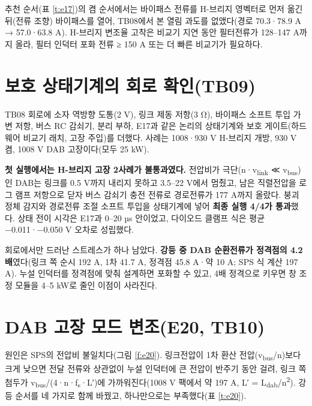 추천 순서(표 \ref{t:e17})의 켬 순서에서는 바이패스 전류를 H-브리지 영벡터로 먼저 옮긴 뒤(전류 조향) 바이패스를 열어, TB08에서 본 열림 과도를 없앴다(경로 70.3·78.9 A → 57.0·63.8 A). H-브리지 변조율 고착은 비교기 지연 동안 필터전류가 128–147 A까지 올라, 필터 인덕터 포화 전류 ≥ 150 A 또는 더 빠른 비교기가 필요하다.

\section{보호 상태기계의 회로 확인(TB09)}

TB08 회로에 소자 역방향 도통(2 V), 링크 제동 저항(3 Ω), 바이패스 소프트 투입 가변 저항, 버스 RC 감쇠기, 분리 부하, E17과 같은 논리의 상태기계와 보호 게이트(하드웨어 비교기 래치, 고장 주입)를 더했다. 사례는 1008·930 V H-브리지 개방, 930 V 켬, 1008 V DAB 고장이다(모두 25 kW).

\textbf{첫 실행에서는 H-브리지 고장 2사례가 불통과였다.} 전압비가 극단(n·v\textsubscript{link} ≪ v\textsubscript{bus})인 DAB는 링크를 0.5 V까지 내리지 못하고 3.5–22 V에서 멈췄고, 남은 직렬전압을 로그 램프 저항으로 닫자 버스 감쇠기 충전 전류로 경로전류가 177 A까지 올랐다. 붕괴 정체 감지와 경로전류 조절 소프트 투입을 상태기계에 넣어 \textbf{최종 실행 4/4가 통과}했다. 상태 전이 시각은 E17과 0–20 µs 안이었고, 다이오드 클램프 식은 평균 −0.011·−0.050 V 오차로 성립했다.

회로에서만 드러난 스트레스가 하나 남았다. \textbf{강등 중 DAB 순환전류가 정격점의 4.2배}였다(링크 쪽 순시 192 A, 1차 41.7 A, 정격점 45.8 A·약 10 A; SPS 식 계산 197 A). 누설 인덕터를 정격점에 맞춰 설계하면 포화할 수 있고, 4배 정격으로 키우면 창 조정 모듈을 4–5 kW로 줄인 이점이 사라진다.

\section{DAB 고장 모드 변조(E20, TB10)}

원인은 SPS의 전압비 불일치다(그림 \ref{f:e20}). 링크전압이 1차 환산 전압(v\textsubscript{bus}/n)보다 크게 낮으면 전달 전류와 상관없이 누설 인덕터에 큰 전압이 반주기 동안 걸려, 링크 쪽 첨두가 v\textsubscript{bus}/(4·n·f\textsubscript{s}·L′)에 가까워진다(1008 V 팩에서 약 197 A, L′ = L\textsubscript{dab}/n\textsuperscript{2}). 강등 순서를 네 가지로 함께 바꿨고, 하나만으로는 부족했다(표 \ref{t:e20}).

